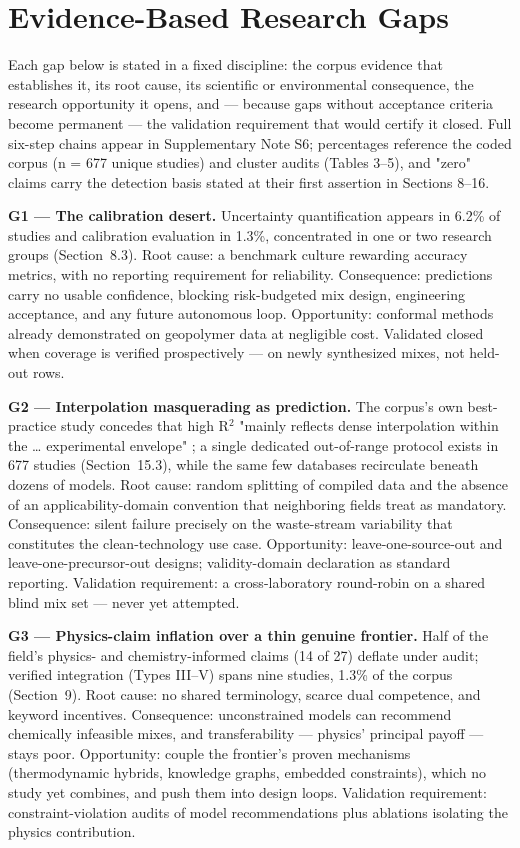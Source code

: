 \documentclass[pdflatex,sn-basic]{sn-jnl}
\begin{document}
\section{Evidence-Based Research Gaps}

Each gap below is stated in a fixed discipline: the corpus evidence that establishes it, its root cause, its scientific or environmental consequence, the research opportunity it opens, and --- because gaps without acceptance criteria become permanent --- the validation requirement that would certify it closed. Full six-step chains appear in Supplementary Note S6; percentages reference the coded corpus (n = 677 unique studies) and cluster audits (Tables 3--5), and "zero" claims carry the detection basis stated at their first assertion in Sections 8--16.

\textbf{G1 --- The calibration desert.} Uncertainty quantification appears in 6.2\% of studies and calibration evaluation in 1.3\%, concentrated in one or two research groups (Section~8.3). Root cause: a benchmark culture rewarding accuracy metrics, with no reporting requirement for reliability. Consequence: predictions carry no usable confidence, blocking risk-budgeted mix design, engineering acceptance, and any future autonomous loop. Opportunity: conformal methods already demonstrated on geopolymer data at negligible cost. Validated closed when coverage is verified prospectively --- on newly synthesized mixes, not held-out rows.

\textbf{G2 --- Interpolation masquerading as prediction.} The corpus's own best-practice study concedes that high R$^2$ "mainly reflects dense interpolation within the … experimental envelope" \citep{jagad2026}; a single dedicated out-of-range protocol exists in 677 studies (Section~15.3), while the same few databases recirculate beneath dozens of models. Root cause: random splitting of compiled data and the absence of an applicability-domain convention that neighboring fields treat as mandatory. Consequence: silent failure precisely on the waste-stream variability that constitutes the clean-technology use case. Opportunity: leave-one-source-out and leave-one-precursor-out designs; validity-domain declaration as standard reporting. Validation requirement: a cross-laboratory round-robin on a shared blind mix set --- never yet attempted.

\textbf{G3 --- Physics-claim inflation over a thin genuine frontier.} Half of the field's physics- and chemistry-informed claims (14 of 27) deflate under audit; verified integration (Types III--V) spans nine studies, 1.3\% of the corpus (Section~9). Root cause: no shared terminology, scarce dual competence, and keyword incentives. Consequence: unconstrained models can recommend chemically infeasible mixes, and transferability --- physics' principal payoff --- stays poor. Opportunity: couple the frontier's proven mechanisms (thermodynamic hybrids, knowledge graphs, embedded constraints), which no study yet combines, and push them into design loops. Validation requirement: constraint-violation audits of model recommendations plus ablations isolating the physics contribution.
\end{document}
